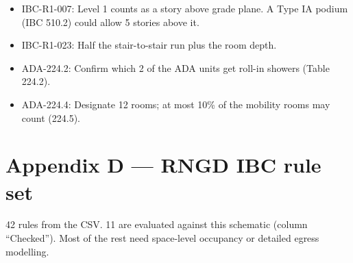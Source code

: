\documentclass[10pt]{article}
\begin{document}
\begin{itemize}
\item IBC-R1-007: Level 1 counts as a story above grade plane. A Type IA podium (IBC 510.2) could allow 5 stories above it.
\item IBC-R1-023: Half the stair-to-stair run plus the room depth.
\item ADA-224.2: Confirm which 2 of the ADA units get roll-in showers (Table 224.2).
\item ADA-224.4: Designate 12 rooms; at most 10\% of the mobility rooms may count (224.5).
\end{itemize}

\section*{Appendix D --- RNGD IBC rule set}
42 rules from the CSV. 11 are evaluated against this schematic (column
``Checked''). Most of the rest need space-level occupancy or detailed egress modelling.
\end{document}
